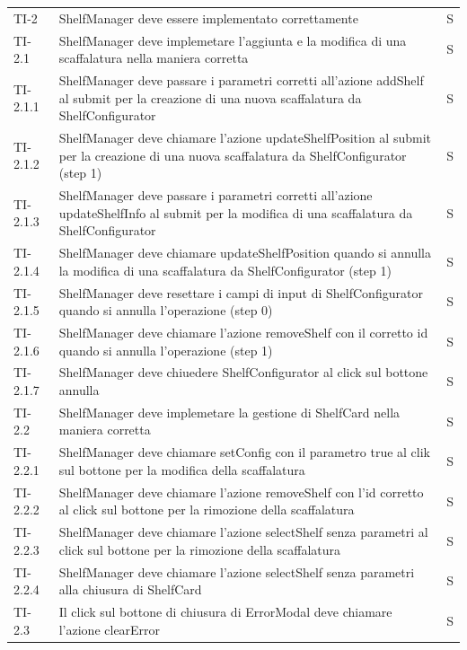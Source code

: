 \begin{xltabular}{0.9\textwidth}{X | p{0.6\textwidth}  | p{0.1\textwidth}}
    TI-2 & ShelfManager deve essere implementato correttamente & S\\
    TI-2.1 & ShelfManager deve implemetare l'aggiunta e la modifica di una scaffalatura nella maniera corretta & S\\
    TI-2.1.1 & ShelfManager deve passare i parametri corretti all'azione addShelf al submit per la creazione di una nuova scaffalatura da ShelfConfigurator & S\\
    TI-2.1.2 & ShelfManager deve chiamare l'azione updateShelfPosition al submit per la creazione di una nuova scaffalatura da ShelfConfigurator (step 1) & S\\
    TI-2.1.3 & ShelfManager deve passare i parametri corretti all'azione updateShelfInfo al submit per la modifica di una scaffalatura da ShelfConfigurator & S\\
    TI-2.1.4 & ShelfManager deve chiamare updateShelfPosition quando si annulla la modifica di una scaffalatura da ShelfConfigurator  (step 1) & S\\
    TI-2.1.5 & ShelfManager deve resettare i campi di input di ShelfConfigurator quando si annulla l'operazione (step 0) & S\\
    TI-2.1.6 & ShelfManager deve chiamare l'azione removeShelf con il corretto id quando si annulla l'operazione (step 1) & S\\
    TI-2.1.7 & ShelfManager deve chiuedere ShelfConfigurator al click sul bottone annulla & S\\
    TI-2.2 & ShelfManager deve implemetare la gestione di ShelfCard nella maniera corretta & S\\
    TI-2.2.1 & ShelfManager deve chiamare setConfig con il parametro true al clik sul bottone per la modifica della scaffalatura & S\\  
    TI-2.2.2 & ShelfManager deve chiamare l'azione removeShelf con l'id corretto al click sul bottone per la rimozione della scaffalatura & S\\
    TI-2.2.3 & ShelfManager deve chiamare l'azione selectShelf senza parametri al click sul bottone per la rimozione della scaffalatura & S\\
    TI-2.2.4 & ShelfManager deve chiamare l'azione selectShelf senza parametri alla chiusura di ShelfCard & S\\
    TI-2.3 & Il click sul bottone di chiusura di ErrorModal deve chiamare l'azione clearError & S\\


\end{xltabular}
